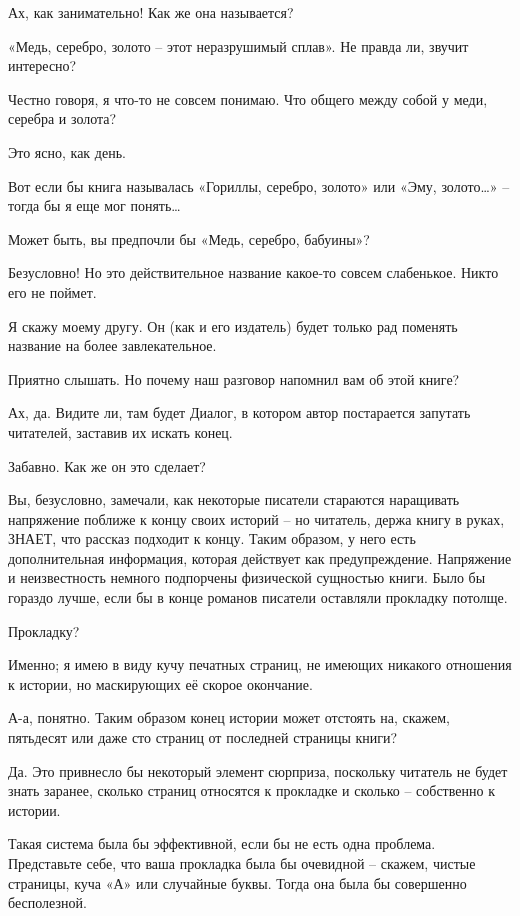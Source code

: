 \documentclass[../main.tex]{subfiles}
\begin{document}
\begin{dialogue}
 Ах, как занимательно! Как же она называется?

 «Медь, серебро, золото \--- этот неразрушимый сплав». Не правда ли, звучит интересно?

 Честно говоря, я что-то не совсем понимаю. Что общего между собой у меди, серебра и золота?

 Это ясно, как день.

 Вот если бы книга называлась «Гориллы, серебро, золото» или «Эму, золото\ldots» \--- тогда бы я еще мог понять\ldots{}

 Может быть, вы предпочли бы «Медь, серебро, бабуины»?

 Безусловно! Но это действительное название какое-то совсем слабенькое. Никто его не поймет.

 Я скажу моему другу. Он (как и его издатель) будет только рад поменять название на более завлекательное.

 Приятно слышать. Но почему наш разговор напомнил вам об этой книге?

 Ах, да. Видите ли, там будет Диалог, в котором автор постарается запутать читателей, заставив их искать конец.

 Забавно. Как же он это сделает?

 Вы, безусловно, замечали, как некоторые писатели стараются наращивать напряжение поближе к концу своих историй \--- но читатель, держа книгу в руках, ЗНАЕТ, что рассказ подходит к концу. Таким образом, у него есть дополнительная информация, которая действует как предупреждение. Напряжение и неизвестность немного подпорчены физической сущностью книги. Было бы гораздо лучше, если бы в конце романов писатели оставляли прокладку потолще.

 Прокладку?

 Именно; я имею в виду кучу печатных страниц, не имеющих никакого отношения к истории, но маскирующих её скорое окончание.

 А-а, понятно. Таким образом конец истории может отстоять на, скажем, пятьдесят или даже сто страниц от последней страницы книги?

 Да. Это привнесло бы некоторый элемент сюрприза, поскольку читатель не будет знать заранее, сколько страниц относятся к прокладке и сколько \--- собственно к истории.

 Такая система была бы эффективной, если бы не есть одна проблема. Представьте себе, что ваша прокладка была бы очевидной \--- скажем, чистые страницы, куча «А» или случайные буквы. Тогда она была бы совершенно бесполезной.


\end{dialogue}
\end{document}
